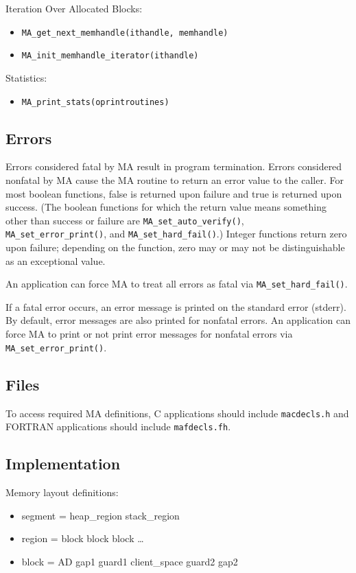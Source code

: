 Iteration Over Allocated Blocks:
\begin{itemize}
\item {\tt MA\_get\_next\_memhandle(ithandle, memhandle)}
\item {\tt MA\_init\_memhandle\_iterator(ithandle)}
\end{itemize}

Statistics:
\begin{itemize}
\item {\tt MA\_print\_stats(oprintroutines)}
\end{itemize}


\subsection{Errors}

Errors considered fatal by MA result in program termination.  Errors
considered nonfatal by MA cause the MA routine to return an error
value to the caller.  For most boolean functions, false is returned
upon failure and true is returned upon success.  (The boolean
functions for which the return value means something other than
success or failure are {\tt MA\_set\_auto\_verify()}, {\tt
  MA\_set\_error\_print()}, and {\tt MA\_set\_hard\_fail()}.)  Integer
functions return zero upon failure; depending on the function, zero
may or may not be distinguishable as an exceptional value.

An application can force MA to treat all errors as fatal via
{\tt MA\_set\_hard\_fail()}.

If a fatal error occurs, an error message is printed on the standard
error (stderr).  By default, error messages are also printed for
nonfatal errors.  An application can force MA to print or not print
error messages for nonfatal errors via {\tt MA\_set\_error\_print()}.

\subsection{Files}

To access required MA definitions, C applications should include
{\tt macdecls.h} and FORTRAN applications should include
{\tt mafdecls.fh}.

\subsection{Implementation}

Memory layout definitions:
\begin{itemize}
\item segment = heap\_region stack\_region
\item region = block block block \ldots
\item block = AD gap1 guard1 client\_space guard2 gap2
\end{itemize}

